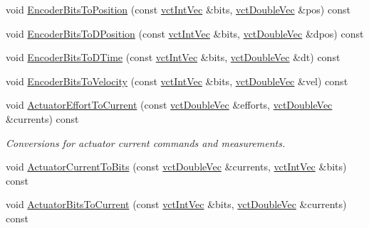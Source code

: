\begin{DoxyCompactItemize}
void \hyperlink{classsaw_robot_i_o1394_1_1osa_robot1394_a965bfe1b495adbb15b851db7a4e6284f}{Encoder\+Bits\+To\+Position} (const \hyperlink{vct_dynamic_vector_types_8h_a47260df0b570a25352b3f318ed0b4c4e}{vct\+Int\+Vec} \&bits, \hyperlink{vct_dynamic_vector_types_8h_ade4b3068c86fb88f41af2e5187e491c2}{vct\+Double\+Vec} \&pos) const 
\item 
void \hyperlink{classsaw_robot_i_o1394_1_1osa_robot1394_af2d53c1c54f1ce55918306b2e9906941}{Encoder\+Bits\+To\+D\+Position} (const \hyperlink{vct_dynamic_vector_types_8h_a47260df0b570a25352b3f318ed0b4c4e}{vct\+Int\+Vec} \&bits, \hyperlink{vct_dynamic_vector_types_8h_ade4b3068c86fb88f41af2e5187e491c2}{vct\+Double\+Vec} \&dpos) const 
\item 
void \hyperlink{classsaw_robot_i_o1394_1_1osa_robot1394_a25fd6e62f012bee2eaae831fca09c3a7}{Encoder\+Bits\+To\+D\+Time} (const \hyperlink{vct_dynamic_vector_types_8h_a47260df0b570a25352b3f318ed0b4c4e}{vct\+Int\+Vec} \&bits, \hyperlink{vct_dynamic_vector_types_8h_ade4b3068c86fb88f41af2e5187e491c2}{vct\+Double\+Vec} \&dt) const 
\item 
void \hyperlink{classsaw_robot_i_o1394_1_1osa_robot1394_a1a38e1c16ad3a8dd7b3294a062893917}{Encoder\+Bits\+To\+Velocity} (const \hyperlink{vct_dynamic_vector_types_8h_a47260df0b570a25352b3f318ed0b4c4e}{vct\+Int\+Vec} \&bits, \hyperlink{vct_dynamic_vector_types_8h_ade4b3068c86fb88f41af2e5187e491c2}{vct\+Double\+Vec} \&vel) const 
\item 
void \hyperlink{classsaw_robot_i_o1394_1_1osa_robot1394_a25209a86c47b754cf7d9290a24a9afa1}{Actuator\+Effort\+To\+Current} (const \hyperlink{vct_dynamic_vector_types_8h_ade4b3068c86fb88f41af2e5187e491c2}{vct\+Double\+Vec} \&efforts, \hyperlink{vct_dynamic_vector_types_8h_ade4b3068c86fb88f41af2e5187e491c2}{vct\+Double\+Vec} \&currents) const 
\begin{DoxyCompactList}\small\item\em Conversions for actuator current commands and measurements. \end{DoxyCompactList}\item 
void \hyperlink{classsaw_robot_i_o1394_1_1osa_robot1394_ad7c3019c97632013924763fb80986b02}{Actuator\+Current\+To\+Bits} (const \hyperlink{vct_dynamic_vector_types_8h_ade4b3068c86fb88f41af2e5187e491c2}{vct\+Double\+Vec} \&currents, \hyperlink{vct_dynamic_vector_types_8h_a47260df0b570a25352b3f318ed0b4c4e}{vct\+Int\+Vec} \&bits) const 
\item 
void \hyperlink{classsaw_robot_i_o1394_1_1osa_robot1394_a9d27b2739d3ce56722f981f26f016c56}{Actuator\+Bits\+To\+Current} (const \hyperlink{vct_dynamic_vector_types_8h_a47260df0b570a25352b3f318ed0b4c4e}{vct\+Int\+Vec} \&bits, \hyperlink{vct_dynamic_vector_types_8h_ade4b3068c86fb88f41af2e5187e491c2}{vct\+Double\+Vec} \&currents) const 

\end{DoxyCompactItemize}
